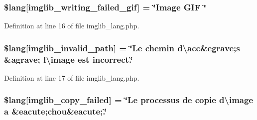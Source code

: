 \subsubsection[{\texorpdfstring{\$lang}{$lang}}]{\setlength{\rightskip}{0pt plus 5cm}\$lang\mbox{[}\textquotesingle{}imglib\+\_\+writing\+\_\+failed\+\_\+gif\textquotesingle{}\mbox{]} = \char`\"{}Image G\+IF \char`\"{}}\hypertarget{application_2language_2french_2imglib__lang_8php_a6169e9ed18d970dcc8965c4f195ae3e7}{}\label{application_2language_2french_2imglib__lang_8php_a6169e9ed18d970dcc8965c4f195ae3e7}


Definition at line 16 of file imglib\+\_\+lang.\+php.

\subsubsection[{\texorpdfstring{\$lang}{$lang}}]{\setlength{\rightskip}{0pt plus 5cm}\$lang\mbox{[}\textquotesingle{}imglib\+\_\+invalid\+\_\+path\textquotesingle{}\mbox{]} = \char`\"{}Le chemin d\textbackslash{}\textquotesingle{}acc\&egrave;{\bf s} \&agrave; l\textbackslash{}\textquotesingle{}image est incorrect.\char`\"{}}\hypertarget{application_2language_2french_2imglib__lang_8php_a8ff486c25806a4731d1ffe20431df825}{}\label{application_2language_2french_2imglib__lang_8php_a8ff486c25806a4731d1ffe20431df825}


Definition at line 17 of file imglib\+\_\+lang.\+php.

\subsubsection[{\texorpdfstring{\$lang}{$lang}}]{\setlength{\rightskip}{0pt plus 5cm}\$lang\mbox{[}\textquotesingle{}imglib\+\_\+copy\+\_\+failed\textquotesingle{}\mbox{]} = \char`\"{}Le processus de copie d\textbackslash{}\textquotesingle{}image {\bf a} \&eacute;chou\&eacute;.\char`\"{}}\hypertarget{application_2language_2french_2imglib__lang_8php_a9363000d2005b8276b39d581a11b562d}{}\label{application_2language_2french_2imglib__lang_8php_a9363000d2005b8276b39d581a11b562d}


